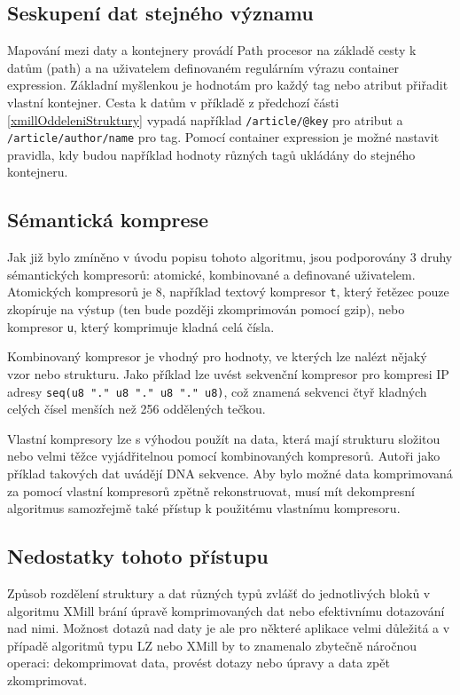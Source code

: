 \subsection{Seskupení dat stejného významu}
Mapování mezi daty a kontejnery provádí Path procesor na základě cesty k datům (path) a na uživatelem definovaném regulárním výrazu container expression. Základní myšlenkou je hodnotám pro každý tag nebo atribut přiřadit vlastní kontejner. Cesta k datům v příkladě z předchozí části \ref{xmillOddeleniStruktury} vypadá například \texttt{/article/@key} pro atribut a \texttt{/article/author/name} pro tag. Pomocí container expression je možné nastavit pravidla, kdy budou například hodnoty různých tagů ukládány do stejného kontejneru.\cite{xmill}

\subsection{Sémantická komprese}
Jak již bylo zmíněno v úvodu popisu tohoto algoritmu, jsou podporovány 3 druhy sémantických kompresorů: atomické, kombinované a definované uživatelem. Atomických kompresorů je 8, například textový kompresor \texttt{t}, který řetězec pouze zkopíruje na výstup (ten bude později zkomprimován pomocí gzip), nebo kompresor \texttt{u}, který komprimuje kladná celá čísla.

Kombinovaný kompresor je vhodný pro hodnoty, ve kterých lze nalézt nějaký vzor nebo strukturu. Jako příklad lze uvést sekvenční kompresor pro kompresi IP adresy \texttt{seq(u8 "." u8 "." u8 "." u8)}, což znamená sekvenci čtyř kladných celých čísel menších než 256 oddělených tečkou.

Vlastní kompresory lze s výhodou použít na data, která mají strukturu složitou nebo velmi těžce vyjádřitelnou pomocí kombinovaných kompresorů. Autoři jako příklad takových dat uvádějí DNA sekvence. Aby bylo možné data komprimovaná za pomocí vlastní kompresorů zpětně rekonstruovat, musí mít dekompresní algoritmus samozřejmě také přístup k použitému vlastnímu kompresoru.\cite{xmill}

\subsection{Nedostatky tohoto přístupu}
Způsob rozdělení struktury a dat různých typů zvlášť do jednotlivých bloků v algoritmu XMill brání úpravě komprimovaných dat nebo efektivnímu dotazování nad nimi. Možnost dotazů nad daty je ale pro některé aplikace velmi důležitá a v případě algoritmů typu LZ nebo XMill by to znamenalo zbytečně náročnou operaci: dekomprimovat data, provést dotazy nebo úpravy a data zpět zkomprimovat.

